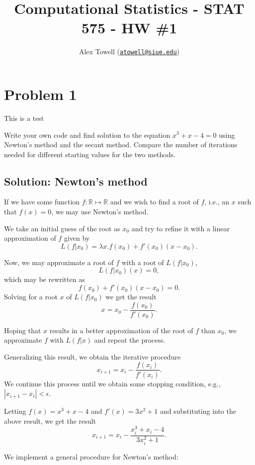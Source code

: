 \documentclass[
]{article}
\title{Computational Statistics - STAT 575 - HW \#1}
\author{Alex Towell
(\href{mailto:atowell@siue.edu}{\nolinkurl{atowell@siue.edu}})}
\date{}
\begin{document}
\maketitle

\hypertarget{problem-1}{%
\section{Problem 1}\label{problem-1}}

This is a test

Write your own code and find solution to the equation
\(x^3 + x - 4 = 0\) using Newton's method and the secant method. Compare
the number of iterations needed for different starting values for the
two methods.

\hypertarget{solution-newtons-method}{%
\subsection{Solution: Newton's method}\label{solution-newtons-method}}

If we have some function \(f : \mathbb{R} \mapsto \mathbb{R}\) and we
wish to find a root of \(f\), i.e., an \(x\) such that \(f(x) = 0\), we
may use Newton's method.

We take an initial guess of the root as \(x_0\) and try to refine it
with a linear approximation of \(f\) given by \[
  L(f | x_0) = \lambda x.f(x_0) + f'(x_0)(x-x_0).
\]

Now, we may approximate a root of \(f\) with a root of \(L(f|x_0)\), \[
  L(f|x_0)(x) = 0,
\] which may be rewritten as \[
  f(x_0) + f'(x_0)(x-x_0) = 0.
\] Solving for a root \(x\) of \(L(f|x_0)\) we get the result \[
  x = x_0 - \frac{f(x_0)}{f'(x_0)}.
\]

Hoping that \(x\) results in a better approximation of the root of \(f\)
than \(x_0\), we approximate \(f\) with \(L(f|x)\) and repeat the
process.

Generalizing this result, we obtain the iterative procedure \[
  x_{i+1} = x_i - \frac{f(x_i)}{f'(x_i)}.
\] We continue this process until we obtain some stopping condition,
e.g., \(|x_{i+1} - x_i| < \epsilon\).

Letting \(f(x) = x^3 + x - 4\) and \(f'(x) = 3x^2 + 1\) and substituting
into the above result, we get the result \[
  x_{i+1} = x_i - \frac{x_i^3+x_i-4}{3x_i^2+1}.
\]

We implement a general procedure for Newton's method:
\end{document}
